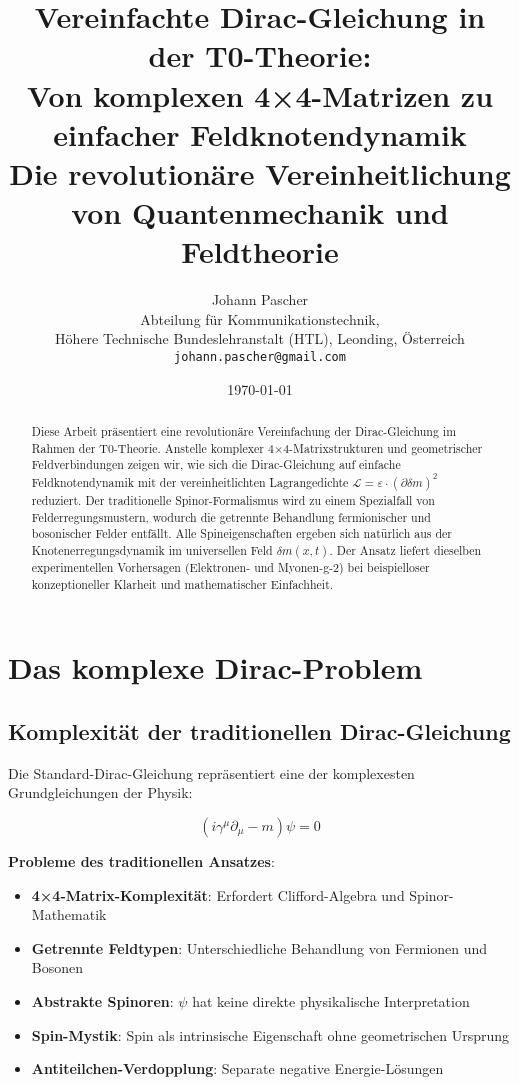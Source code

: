 \documentclass[12pt,a4paper]{article}
\title{Vereinfachte Dirac-Gleichung in der T0-Theorie: \\
	Von komplexen 4×4-Matrizen zu einfacher Feldknotendynamik \\
	\large Die revolutionäre Vereinheitlichung von Quantenmechanik und Feldtheorie}
\author{Johann Pascher\\
	Abteilung für Kommunikationstechnik, \\Höhere Technische Bundeslehranstalt (HTL), Leonding, Österreich\\
	\texttt{johann.pascher@gmail.com}}
\date{\today}
\newcommand{\Lag}{\mathcal{L}}
\newcommand{\deltam}{\delta m}
\theoremstyle{definition}
\theoremstyle{remark}
\begin{document}
	
	\maketitle
	
	\begin{abstract}
		Diese Arbeit präsentiert eine revolutionäre Vereinfachung der Dirac-Gleichung im Rahmen der T0-Theorie. Anstelle komplexer 4×4-Matrixstrukturen und geometrischer Feldverbindungen zeigen wir, wie sich die Dirac-Gleichung auf einfache Feldknotendynamik mit der vereinheitlichten Lagrangedichte $\Lag = \varepsilon \cdot (\partial \deltam)^2$ reduziert. Der traditionelle Spinor-Formalismus wird zu einem Spezialfall von Felderregungsmustern, wodurch die getrennte Behandlung fermionischer und bosonischer Felder entfällt. Alle Spineigenschaften ergeben sich natürlich aus der Knotenerregungsdynamik im universellen Feld $\deltam(x,t)$. Der Ansatz liefert dieselben experimentellen Vorhersagen (Elektronen- und Myonen-g-2) bei beispielloser konzeptioneller Klarheit und mathematischer Einfachheit.
	\end{abstract}
	
	\tableofcontents
	\newpage
	
	\section{Das komplexe Dirac-Problem}
	
	\subsection{Komplexität der traditionellen Dirac-Gleichung}
	
	Die Standard-Dirac-Gleichung repräsentiert eine der komplexesten Grundgleichungen der Physik:
	
	\begin{equation}
		(i\gamma^{\mu}\partial_{\mu} - m)\psi = 0
		\label{eq:standard_dirac}
	\end{equation}
	
	\textbf{Probleme des traditionellen Ansatzes}:
	\begin{itemize}
		\item \textbf{4×4-Matrix-Komplexität}: Erfordert Clifford-Algebra und Spinor-Mathematik
		\item \textbf{Getrennte Feldtypen}: Unterschiedliche Behandlung von Fermionen und Bosonen
		\item \textbf{Abstrakte Spinoren}: $\psi$ hat keine direkte physikalische Interpretation
		\item \textbf{Spin-Mystik}: Spin als intrinsische Eigenschaft ohne geometrischen Ursprung
		\item \textbf{Antiteilchen-Verdopplung}: Separate negative Energie-Lösungen
	\end{itemize}
	
\end{document}
